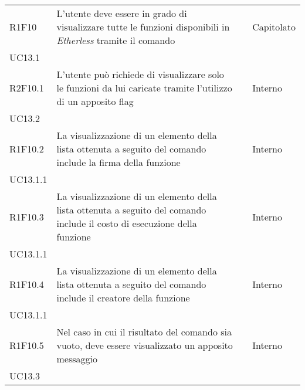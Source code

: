 \begin{longtable}{ 
		>{\centering}p{} 
		>{}p{} 
		>{\centering}p{}
		>{\centering}p{} }
	R1F10 & L'utente deve essere in grado di visualizzare tutte le funzioni 
		disponibili in \textit{Etherless} tramite il comando \list{} 				& \ob & Capitolato \\ UC13.1 \tabularnewline
	R2F10.1 & L'utente può richiede di visualizzare solo le funzioni da 
		lui caricate tramite l'utilizzo di un apposito flag 						& \de & Interno \\ UC13.2 \tabularnewline
	R1F10.2 & La visualizzazione di un elemento della lista ottenuta a seguito 
		del comando \lista{} include la firma della funzione 						& \ob & Interno \\ UC13.1.1 \tabularnewline
	R1F10.3 & La visualizzazione di un elemento della lista ottenuta a seguito 
		del comando \lista{} include il costo di esecuzione della funzione 			& \ob & Interno \\ UC13.1.1 \tabularnewline
	R1F10.4 & La visualizzazione di un elemento della lista ottenuta a seguito 
		del comando \lista{} include il creatore della funzione 					& \ob & Interno \\ UC13.1.1 \tabularnewline
	R1F10.5 & Nel caso in cui il risultato del comando \lista{} sia vuoto, deve 
		essere visualizzato un apposito messaggio 									& \ob & Interno \\ UC13.3 \tabularnewline
	

\end{longtable}
